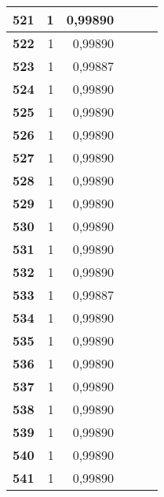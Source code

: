 {\begin{longtable}{|r|r|r|l|r|r|}
\textbf{521} & 1 & 0,99890 &  & \multicolumn{1}{l|}{} & \multicolumn{1}{l|}{} \\ \hline
\textbf{522} & 1 & 0,99890 &  & \multicolumn{1}{l|}{} & \multicolumn{1}{l|}{} \\ \hline
\textbf{523} & 1 & 0,99887 &  & \multicolumn{1}{l|}{} & \multicolumn{1}{l|}{} \\ \hline
\textbf{524} & 1 & 0,99890 &  & \multicolumn{1}{l|}{} & \multicolumn{1}{l|}{} \\ \hline
\textbf{525} & 1 & 0,99890 &  & \multicolumn{1}{l|}{} & \multicolumn{1}{l|}{} \\ \hline
\textbf{526} & 1 & 0,99890 &  & \multicolumn{1}{l|}{} & \multicolumn{1}{l|}{} \\ \hline
\textbf{527} & 1 & 0,99890 &  & \multicolumn{1}{l|}{} & \multicolumn{1}{l|}{} \\ \hline
\textbf{528} & 1 & 0,99890 &  & \multicolumn{1}{l|}{} & \multicolumn{1}{l|}{} \\ \hline
\textbf{529} & 1 & 0,99890 &  & \multicolumn{1}{l|}{} & \multicolumn{1}{l|}{} \\ \hline
\textbf{530} & 1 & 0,99890 &  & \multicolumn{1}{l|}{} & \multicolumn{1}{l|}{} \\ \hline
\textbf{531} & 1 & 0,99890 &  & \multicolumn{1}{l|}{} & \multicolumn{1}{l|}{} \\ \hline
\textbf{532} & 1 & 0,99890 &  & \multicolumn{1}{l|}{} & \multicolumn{1}{l|}{} \\ \hline
\textbf{533} & 1 & 0,99887 &  & \multicolumn{1}{l|}{} & \multicolumn{1}{l|}{} \\ \hline
\textbf{534} & 1 & 0,99890 &  & \multicolumn{1}{l|}{} & \multicolumn{1}{l|}{} \\ \hline
\textbf{535} & 1 & 0,99890 &  & \multicolumn{1}{l|}{} & \multicolumn{1}{l|}{} \\ \hline
\textbf{536} & 1 & 0,99890 &  & \multicolumn{1}{l|}{} & \multicolumn{1}{l|}{} \\ \hline
\textbf{537} & 1 & 0,99890 &  & \multicolumn{1}{l|}{} & \multicolumn{1}{l|}{} \\ \hline
\textbf{538} & 1 & 0,99890 &  & \multicolumn{1}{l|}{} & \multicolumn{1}{l|}{} \\ \hline
\textbf{539} & 1 & 0,99890 &  & \multicolumn{1}{l|}{} & \multicolumn{1}{l|}{} \\ \hline
\textbf{540} & 1 & 0,99890 &  & \multicolumn{1}{l|}{} & \multicolumn{1}{l|}{} \\ \hline
\textbf{541} & 1 & 0,99890 &  & \multicolumn{1}{l|}{} & \multicolumn{1}{l|}{} \\ \hline

\end{longtable}}
